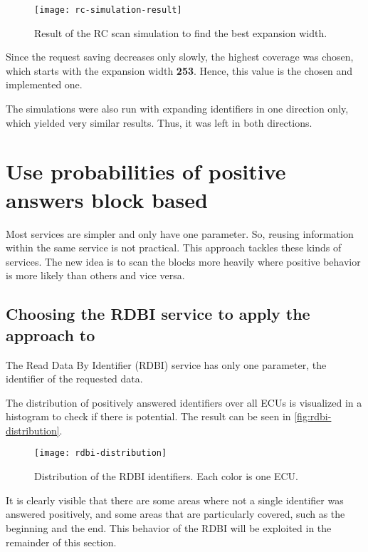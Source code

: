 \begin{figure}[h]
    \centering
    \texttt{[image: rc-simulation-result]}
    \caption{Result of the RC scan simulation to find the best expansion width.}
    \label{fig:rc-simulation-result}
\end{figure}

Since the request saving decreases only slowly, the highest coverage was chosen, which starts with the expansion width \textbf{253}. Hence, this value is the chosen and implemented one.

The simulations were also run with expanding identifiers in one direction only, which yielded very similar results. Thus, it was left in both directions.


\section{Use probabilities of positive answers block based}

Most services are simpler and only have one parameter. So, reusing information within the same service is not practical. This approach tackles these kinds of services. The new idea is to scan the blocks more heavily where positive behavior is more likely than others and vice versa.

\subsection{Choosing the RDBI service to apply the approach to}

The Read Data By Identifier (RDBI) service has only one parameter, the identifier of the requested data.

The distribution of positively answered identifiers over all ECUs is visualized in a histogram to check if there is potential. The result can be seen in \autoref{fig:rdbi-distribution}.

\begin{figure}[h]
    \centering
    \texttt{[image: rdbi-distribution]}
    \caption{Distribution of the RDBI identifiers. Each color is one ECU.}
    \label{fig:rdbi-distribution}
\end{figure}

It is clearly visible that there are some areas where not a single identifier was answered positively, and some areas that are particularly covered, such as the beginning and the end. This behavior of the RDBI will be exploited in the remainder of this section.

